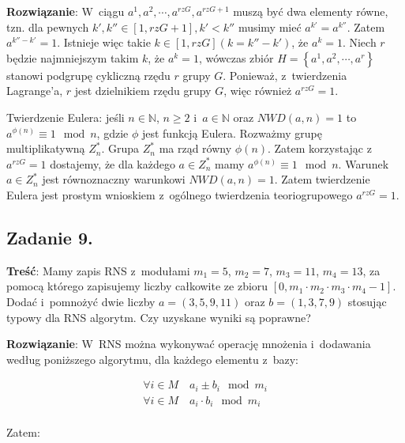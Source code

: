 \documentclass[a4paper,10pt, twocolumn]{article}
\begin{document}
\textbf{Rozwiązanie}: W~ciągu $a^{1}, a^{2}, \cdots, a^{rzG}, a^{rzG + 1}$ muszą być dwa elementy równe, tzn. dla pewnych $k', k'' \in [1, rzG + 1], k' < k''$ musimy mieć $a^{k'} = a^{k''}$. Zatem $a^{k'' - k'} = 1$. Istnieje więc takie $k \in [1, rzG] (k = k'' - k')$, że $a^{k} = 1$. Niech $r$ będzie najmniejszym takim $k$, że $a^{k} = 1$, wówczas zbiór $H = \left\{a^{1}, a^{2}, \cdots, a^{r}\right\}$ stanowi podgrupę cykliczną rzędu $r$ grupy $G$. Ponieważ, z~twierdzenia Lagrange'a, $r$ jest dzielnikiem rzędu grupy $G$, więc również $a^{rzG} = 1$.

\noindent Twierdzenie Eulera: jeśli $n \in \mathbb{N}$, $n \geq 2$ i~$a \in \mathbb{N}$ oraz $NWD(a, n) = 1$ to $a^{\phi(n)} \equiv 1 \mod n$, gdzie $\phi$ jest funkcją Eulera. Rozważmy grupę multiplikatywną $Z_{n}^{*}$. Grupa $Z_{n}^{*}$ ma rząd równy $\phi(n)$. Zatem korzystając z~$a^{rzG} = 1$ dostajemy, że dla każdego $a \in Z_{n}^{*}$ mamy $a^{\phi(n)} \equiv 1 \mod n$. Warunek $a \in Z_{n}^{*}$ jest równoznaczny warunkowi $NWD(a, n) = 1$. Zatem twierdzenie Eulera jest prostym wnioskiem z~ogólnego twierdzenia teoriogrupowego $a^{rzG} = 1$.

\subsection{Zadanie 9.}

\textbf{Treść}: Mamy zapis RNS z~modułami $m_{1} = 5$, $m_{2} = 7$, $m_{3} = 11$, $m_{4} = 13$, za pomocą którego zapisujemy liczby całkowite ze zbioru $[0, m_{1} \cdot m_{2} \cdot m_{3} \cdot m_{4} - 1]$. Dodać i~pomnożyć dwie liczby $a = (3, 5, 9, 11)$ oraz $b = (1, 3, 7, 9)$ stosując typowy dla RNS algorytm. Czy uzyskane wyniki są poprawne?

\textbf{Rozwiązanie}: W~RNS można wykonywać operację mnożenia i~dodawania według poniższego algorytmu, dla każdego elementu z~bazy:

\begin{equation*}
	\begin{array}{l} \forall i \in M \quad a_{i} \pm b_{i} \mod m_{i} \\ \forall i \in M \quad a_{i} \cdot b_{i} \mod m_{i} \\ \end{array}
\end{equation*}

\noindent Zatem:
\end{document}
